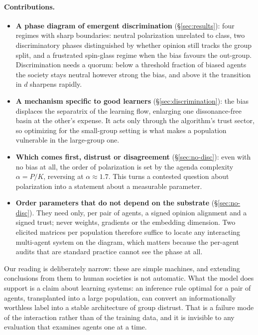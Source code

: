 \documentclass{article}
\begin{document}
\paragraph{Contributions.}
\begin{itemize}\itemsep1pt
  \item \textbf{A phase diagram of emergent discrimination}
    (\S\ref{sec:results}): four regimes with sharp boundaries: neutral
    polarization unrelated to class, two discriminatory phases distinguished by
    whether opinion still tracks the group split, and a frustrated spin-glass
    regime when the bias favours the out-group. Discrimination needs a quorum:
    below a threshold fraction of biased agents the society stays neutral however
    strong the bias, and above it the transition in $d$ sharpens rapidly.
  \item \textbf{A mechanism specific to good learners}
    (\S\ref{sec:discrimination}): the bias displaces the separatrix of the
    learning flow, enlarging one dissonance-free basin at the other's expense.
    It acts only through the algorithm's trust sector, so optimizing for the
    small-group setting is what makes a population vulnerable in the large-group
    one.
  \item \textbf{Which comes first, distrust or disagreement}
    (\S\ref{sec:no-disc}): even with no bias at all, the order of polarization is
    set by the agenda
    complexity $\alpha=P/K$, reversing at $\alpha\approx1.7$. This turns a
    contested question about polarization
    \citep{fiorina2008polarization,iyengar2012affect} into a statement about a
    measurable parameter.
  \item \textbf{Order parameters that do not depend on the substrate}
    (\S\ref{sec:no-disc}). They need only, per pair of agents, a signed
    opinion alignment and a signed trust; never weights, gradients or the
    embedding dimension. Two elicited matrices per population therefore suffice to
    locate any interacting multi-agent system on the diagram, which matters because
    the per-agent audits that are standard practice cannot see the phase at all.
\end{itemize}

Our reading is deliberately narrow: these are simple machines, and extending
conclusions from them to human societies is not automatic. What the model does
support is a claim about learning systems:
an inference rule optimal for a
pair of agents, transplanted into a large population, can convert an
informationally worthless label into a stable architecture of group distrust. That
is a failure mode of the interaction rather than of the training data, and it is
invisible to any evaluation that examines agents one at a time.
\end{document}
